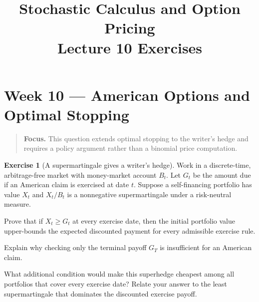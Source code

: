 \documentclass[11pt]{article}
\title{Stochastic Calculus and Option Pricing\\Lecture 10 Exercises}
\author{}
\date{}
\theoremstyle{definition}
\newtheorem{exercise}{Exercise}[section]
\newcommand{\lecturesummary}[1]{\begin{quote}\small\textbf{Focus.} #1\end{quote}}
\begin{document}
\maketitle
\vspace{-1.2em}
\setcounter{section}{9}
\fi

\section{Week 10 --- American Options and Optimal Stopping}
\lecturesummary{This question extends optimal stopping to the writer's hedge
and requires a policy argument rather than a binomial price computation.}


\begin{exercise}[A supermartingale gives a writer's hedge]
Work in a discrete-time, arbitrage-free market with money-market account
\(B_t\). Let \(G_t\) be the amount due if an American claim is exercised at
date \(t\). Suppose a self-financing portfolio has value \(X_t\) and
\(X_t/B_t\) is a nonnegative supermartingale under a risk-neutral measure.
\begin{exparts}
  \item Prove that if \(X_t\geq G_t\) at every exercise date, then the
  initial portfolio value upper-bounds the expected discounted payment for
  every admissible exercise rule.
  \item Explain why checking only the terminal payoff \(G_T\) is
  insufficient for an American claim.
  \item What additional condition would make this superhedge cheapest among
  all portfolios that cover every exercise date? Relate your answer to the
  least supermartingale that dominates the discounted exercise payoff.
\end{exparts}
\end{exercise}

\ifdefined\ExercisesSynthesis\else
\end{document}
